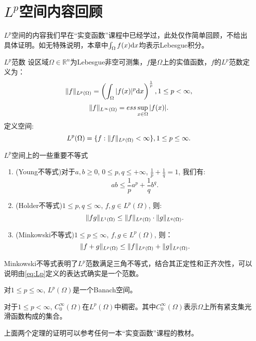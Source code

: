 \section{$L^{p}$空间内容回顾}
$L^{p}$空间的内容我们早在“实变函数”课程中已经学过，此处仅作简单回顾，不给出具体证明。如无特殊说明，本章中$\int_{\Omega}f(x)\mathrm{d} x$均表示Lebesgue积分。
\begin{definition}{$L^{p}$范数}
    设区域$\Omega\in\mathbb{R}^{n}$为Lebesgue非空可测集，$f$是$\Omega$上的实值函数，$f$的$L^{p}$范数定义为：
    \begin{equation}
        \label{eq:Lp}
        \|f\|_{L^{p}(\Omega)}=\left(\int_{\Omega}|f(x)|^{p}\mathrm{d} x\right)^{\frac{1}{p}},1\le p<\infty,
    \end{equation}
    \begin{equation}
        \label{eq:Linf}
        \|f\|_{L^{\infty}(\Omega)}=ess\sup_{x\in\Omega}|f(x)|.
    \end{equation}
    定义空间:
    \begin{equation}
        L^{p}(\Omega)=\{f:\|f\|_{L^{p}(\Omega)}<\infty\},1\le p\le\infty.
    \end{equation}
\end{definition}
\begin{proposition}{$L^{p}$空间上的一些重要不等式}
    \begin{enumerate}
        \item (Young不等式)对于$a,b\ge 0$, $0\le p,q\le+\infty$, $\frac{1}{p}+\frac{1}{q}=1$, 我们有:
        \begin{equation}
            \label{eq:Young}
            ab\le\frac{1}{p}a^{p}+\frac{1}{q}b^{q}.
        \end{equation}
        \item (Holder不等式)$1\le p,q\le \infty$, $f,g\in L^{p}(\Omega)$, 则:
        \begin{equation}
            \label{eq:Holder}
            \|fg\|_{L^{1}(\Omega)}\le\|f\|_{L^{p}(\Omega)}\cdot\|g\|_{L^{q}(\Omega)}.
        \end{equation}
        \item (Minkowski不等式)$1\le p\le\infty$, $f,g\in L^{p}(\Omega)$, 则：
        \begin{equation}
            \|f+g\|_{L^{p}(\Omega)}\le\|f\|_{L^{p}(\Omega)}+\|g\|_{L^{p}(\Omega)}.
        \end{equation}
    \end{enumerate}
\end{proposition}
\begin{remark}
    Minkowski不等式表明了$L^{p}$范数满足三角不等式，结合其正定性和正齐次性，可以说明由\eqref{eq:Lp}定义的表达式确实是一个范数。
\end{remark}
\begin{theorem}
    对$1\le p\le\infty$, $L^{p}(\Omega)$是一个Banach空间。
\end{theorem}
\begin{theorem}
    对于$1\le p<\infty$, $C_{0}^{\infty}(\Omega)$在$L^{p}(\Omega)$中稠密。其中$C_{0}^{\infty}(\Omega)$表示$\Omega$上所有紧支集光滑函数构成的集合。
\end{theorem}
上面两个定理的证明可以参考任何一本“实变函数”课程的教材。
